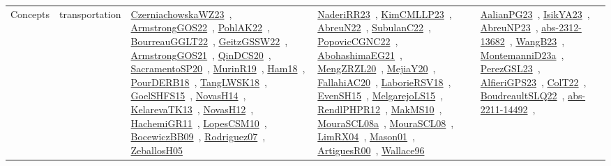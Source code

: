 {\begin{longtable}{lp{3cm}>{\raggedright\arraybackslash}p{6cm}>{\raggedright\arraybackslash}p{6cm}>{\raggedright\arraybackslash}p{8cm}}
Concepts & transportation & \href{works/CzerniachowskaWZ23.pdf}{CzerniachowskaWZ23}~\cite{CzerniachowskaWZ23}, \href{works/ArmstrongGOS22.pdf}{ArmstrongGOS22}~\cite{ArmstrongGOS22}, \href{works/PohlAK22.pdf}{PohlAK22}~\cite{PohlAK22}, \href{works/BourreauGGLT22.pdf}{BourreauGGLT22}~\cite{BourreauGGLT22}, \href{works/GeitzGSSW22.pdf}{GeitzGSSW22}~\cite{GeitzGSSW22}, \href{works/ArmstrongGOS21.pdf}{ArmstrongGOS21}~\cite{ArmstrongGOS21}, \href{works/QinDCS20.pdf}{QinDCS20}~\cite{QinDCS20}, \href{works/SacramentoSP20.pdf}{SacramentoSP20}~\cite{SacramentoSP20}, \href{works/MurinR19.pdf}{MurinR19}~\cite{MurinR19}, \href{works/Ham18.pdf}{Ham18}~\cite{Ham18}, \href{works/PourDERB18.pdf}{PourDERB18}~\cite{PourDERB18}, \href{works/TangLWSK18.pdf}{TangLWSK18}~\cite{TangLWSK18}, \href{works/GoelSHFS15.pdf}{GoelSHFS15}~\cite{GoelSHFS15}, \href{works/NovasH14.pdf}{NovasH14}~\cite{NovasH14}, \href{works/KelarevaTK13.pdf}{KelarevaTK13}~\cite{KelarevaTK13}, \href{works/NovasH12.pdf}{NovasH12}~\cite{NovasH12}, \href{works/HachemiGR11.pdf}{HachemiGR11}~\cite{HachemiGR11}, \href{works/LopesCSM10.pdf}{LopesCSM10}~\cite{LopesCSM10}, \href{works/BocewiczBB09.pdf}{BocewiczBB09}~\cite{BocewiczBB09}, \href{works/Rodriguez07.pdf}{Rodriguez07}~\cite{Rodriguez07}, \href{works/ZeballosH05.pdf}{ZeballosH05}~\cite{ZeballosH05} & \href{works/NaderiRR23.pdf}{NaderiRR23}~\cite{NaderiRR23}, \href{works/KimCMLLP23.pdf}{KimCMLLP23}~\cite{KimCMLLP23}, \href{works/AbreuN22.pdf}{AbreuN22}~\cite{AbreuN22}, \href{works/SubulanC22.pdf}{SubulanC22}~\cite{SubulanC22}, \href{works/PopovicCGNC22.pdf}{PopovicCGNC22}~\cite{PopovicCGNC22}, \href{works/AbohashimaEG21.pdf}{AbohashimaEG21}~\cite{AbohashimaEG21}, \href{works/MengZRZL20.pdf}{MengZRZL20}~\cite{MengZRZL20}, \href{works/MejiaY20.pdf}{MejiaY20}~\cite{MejiaY20}, \href{works/FallahiAC20.pdf}{FallahiAC20}~\cite{FallahiAC20}, \href{works/LaborieRSV18.pdf}{LaborieRSV18}~\cite{LaborieRSV18}, \href{works/EvenSH15.pdf}{EvenSH15}~\cite{EvenSH15}, \href{works/MelgarejoLS15.pdf}{MelgarejoLS15}~\cite{MelgarejoLS15}, \href{works/RendlPHPR12.pdf}{RendlPHPR12}~\cite{RendlPHPR12}, \href{works/MakMS10.pdf}{MakMS10}~\cite{MakMS10}, \href{works/MouraSCL08a.pdf}{MouraSCL08a}~\cite{MouraSCL08a}, \href{works/MouraSCL08.pdf}{MouraSCL08}~\cite{MouraSCL08}, \href{works/LimRX04.pdf}{LimRX04}~\cite{LimRX04}, \href{works/Mason01.pdf}{Mason01}~\cite{Mason01}, \href{works/ArtiguesR00.pdf}{ArtiguesR00}~\cite{ArtiguesR00}, \href{works/Wallace96.pdf}{Wallace96}~\cite{Wallace96} & \href{works/AalianPG23.pdf}{AalianPG23}~\cite{AalianPG23}, \href{works/IsikYA23.pdf}{IsikYA23}~\cite{IsikYA23}, \href{works/AbreuNP23.pdf}{AbreuNP23}~\cite{AbreuNP23}, \href{works/abs-2312-13682.pdf}{abs-2312-13682}~\cite{abs-2312-13682}, \href{works/WangB23.pdf}{WangB23}~\cite{WangB23}, \href{works/MontemanniD23a.pdf}{MontemanniD23a}~\cite{MontemanniD23a}, \href{works/PerezGSL23.pdf}{PerezGSL23}~\cite{PerezGSL23}, \href{works/AlfieriGPS23.pdf}{AlfieriGPS23}~\cite{AlfieriGPS23}, \href{works/ColT22.pdf}{ColT22}~\cite{ColT22}, \href{works/BoudreaultSLQ22.pdf}{BoudreaultSLQ22}~\cite{BoudreaultSLQ22}, \href{works/abs-2211-14492.pdf}{abs-2211-14492}~\cite{abs-2211-14492}, 
\end{longtable}}
